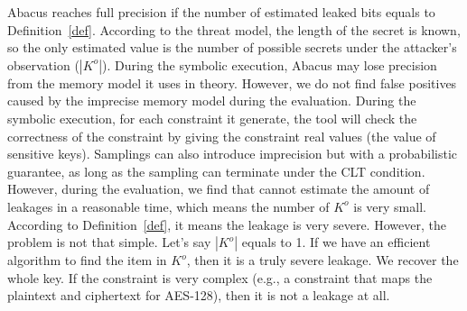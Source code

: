 Abacus reaches full precision if the number of estimated leaked bits equals to Definition~\ref{def}. 
According to the threat model, the length of the secret is known, 
so the only estimated value is the number of possible secrets under the attacker's observation 
($|K^o|$). During the symbolic execution,
Abacus may lose precision from the memory model it uses in theory. 
However, we do not find false positives caused by the imprecise memory model during 
the evaluation. During the symbolic execution, for each constraint it generate,
the tool will check the correctness of the constraint by giving the constraint
real values (the value of sensitive keys).
Samplings can also introduce imprecision but with a probabilistic guarantee,
as long as the sampling can terminate under the CLT condition. However,
during the evaluation, we find that \tool{} cannot estimate the amount of leakages 
in a reasonable time, which means the number of $K^o$ is very small. According to 
Definition~\ref{def}, it means the leakage is very severe. However, the problem is 
not that simple. Let's say $|K^o|$ equals to 1.
If we have an efficient algorithm to find the item in $K^o$,
then it is a truly severe leakage. We recover the whole key. If the constraint is very complex
(e.g., a constraint that maps the plaintext and ciphertext for AES-128), then it is 
not a leakage at all.
